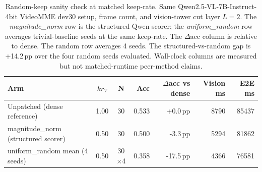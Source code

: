 \begin{table}[H]
\centering
\caption{Random-keep sanity check at matched keep-rate. Same Qwen2.5-VL-7B-Instruct-4bit VideoMME dev30 setup, frame count, and vision-tower cut layer \(L=2\). The \emph{magnitude\_norm} row is the structured Qwen scorer; the \emph{uniform\_random} row averages trivial-baseline seeds at the same keep-rate. The \(\Delta\)acc column is relative to dense. The random row averages 4 seeds. The structured-vs-random gap is +14.2\,pp over the four random seeds evaluated. Wall-clock columns are measured but not matched-runtime peer-method claims.}
\label{tab:competitor-positioning}
\small
\renewcommand{\arraystretch}{\PaperTableStretch}
\begin{tabular}{@{}l c c r r r r@{}}
\toprule
Arm & \(kr_V\) & N & Acc & $\Delta$acc vs dense & Vision ms & E2E ms \\
\midrule
Unpatched (dense reference) & 1.00 & 30 & 0.533 & +0.0\,pp & 8790 & 85437 \\
magnitude\_norm (structured scorer) & 0.50 & 30 & 0.500 & -3.3\,pp & 5294 & 81862 \\
uniform\_random mean (4 seeds) & 0.50 & 30$\times$4 & 0.358 & -17.5\,pp & 4366 & 76581 \\
\bottomrule
\end{tabular}
\end{table}
